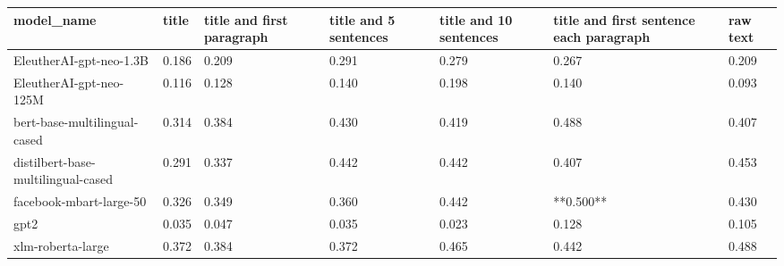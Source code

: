 \begin{tabular}{lllllll}
\toprule
                        model\_name & title & title and first paragraph & title and 5 sentences & title and 10 sentences & title and first sentence each paragraph & raw text \\
\midrule
           EleutherAI-gpt-neo-1.3B & 0.186 &                     0.209 &                 0.291 &                  0.279 &                                   0.267 &    0.209 \\
           EleutherAI-gpt-neo-125M & 0.116 &                     0.128 &                 0.140 &                  0.198 &                                   0.140 &    0.093 \\
      bert-base-multilingual-cased & 0.314 &                     0.384 &                 0.430 &                  0.419 &                                   0.488 &    0.407 \\
distilbert-base-multilingual-cased & 0.291 &                     0.337 &                 0.442 &                  0.442 &                                   0.407 &    0.453 \\
           facebook-mbart-large-50 & 0.326 &                     0.349 &                 0.360 &                  0.442 &                               **0.500** &    0.430 \\
                              gpt2 & 0.035 &                     0.047 &                 0.035 &                  0.023 &                                   0.128 &    0.105 \\
                 xlm-roberta-large & 0.372 &                     0.384 &                 0.372 &                  0.465 &                                   0.442 &    0.488 \\
\bottomrule
\end{tabular}
